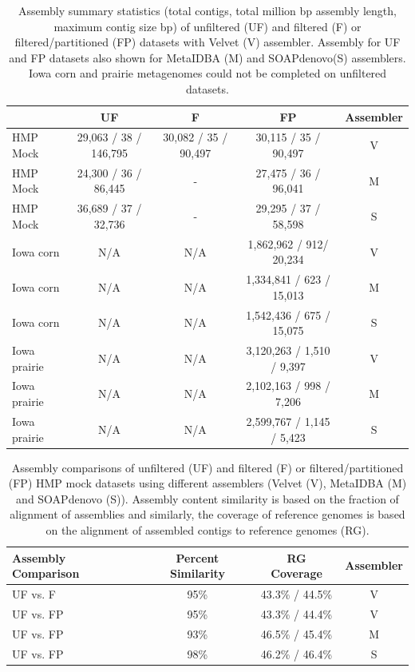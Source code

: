 \documentclass[11pt]{article} %
\begin{document}
\begin{table}[ht]
\caption{Assembly summary statistics (total contigs, total million bp
  assembly length, maximum contig size bp) of unfiltered (UF) and
  filtered (F) or filtered/partitioned (FP) datasets with Velvet (V)
  assembler.  Assembly for UF and FP datasets also shown for MetaIDBA
  (M) and SOAPdenovo(S) assemblers.  Iowa corn and prairie metagenomes
  could not be completed on unfiltered datasets.}
\begin{tabular}{l c c c c}
& UF & F & FP & Assembler \\
\hline
HMP Mock & 29,063 / 38 / 146,795 & 30,082 / 35 / 90,497 & 30,115 / 35
/ 90,497 & V \\
HMP Mock & 24,300 / 36  / 86,445 & - & 27,475 / 36 / 96,041 & M \\
HMP Mock & 36,689 / 37 / 32,736 & - & 29,295 / 37 / 58,598 & S \\
Iowa corn & N/A & N/A & 1,862,962 / 912/ 20,234 & V \\
Iowa corn & N/A & N/A & 1,334,841 / 623 / 15,013 & M \\
Iowa corn & N/A & N/A & 1,542,436 / 675 / 15,075 & S \\
Iowa prairie & N/A & N/A & 3,120,263 / 1,510 / 9,397 & V \\
Iowa prairie & N/A & N/A & 2,102,163 / 998 / 7,206 & M \\
Iowa prairie & N/A & N/A & 2,599,767 / 1,145 / 5,423 & S \\
\end{tabular}
\label{assembly-summary}
\end{table}

\begin{table}[ht]
\caption{Assembly comparisons of unfiltered (UF) and filtered (F) or
  filtered/partitioned (FP) HMP mock datasets using different
  assemblers (Velvet (V), MetaIDBA (M) and SOAPdenovo (S)).  Assembly
  content similarity is based on the fraction of alignment of
  assemblies and similarly, the coverage of reference genomes is based
  on the alignment of assembled contigs to reference genomes (RG).}
\begin{tabular}{l c c c}
Assembly Comparison & Percent Similarity & RG Coverage & Assembler \\
\hline
UF vs. F & 95\% & 43.3\% / 44.5\% & V \\
UF vs. FP & 95\% & 43.3\% / 44.4\% & V\\
UF vs. FP & 93\% & 46.5\% / 45.4\% & M\\ 
UF vs. FP & 98\% &  46.2\% / 46.4\% & S\\
\end{tabular}
\label{assembly-compare}
\end{table}
\end{document}
